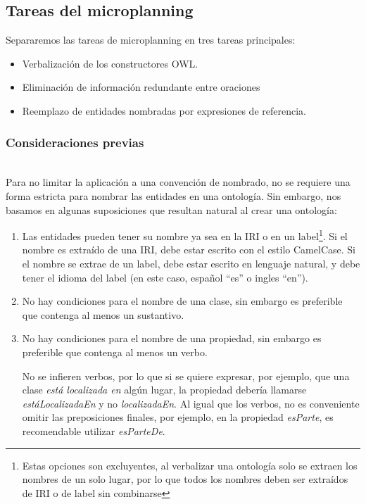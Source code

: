 \subsection{Tareas del microplanning}
Separaremos las tareas de microplanning en tres tareas principales: 
\begin{itemize}
    \item Verbalización de los constructores OWL.
    \item Eliminación de información redundante entre oraciones
    \item Reemplazo de entidades nombradas por expresiones de referencia.
\end{itemize}


\subsubsection{Consideraciones previas}
 \\
Para no limitar la aplicación a una convención de nombrado, no se requiere una forma estricta para nombrar las entidades en una ontología. Sin embargo, nos basamos en algunas suposiciones que resultan natural al crear una ontología:
\begin{enumerate}
    \item Las entidades pueden tener su nombre ya sea en la IRI o en un label\footnote{Estas opciones son excluyentes, al verbalizar una ontología solo se extraen los nombres de un solo lugar, por lo que todos los nombres deben ser extraídos de IRI o de label sin combinarse}. Si el nombre es extraído de una IRI, debe estar escrito con el estilo CamelCase. Si el nombre se extrae de un label, debe estar escrito en lenguaje natural, y debe tener el idioma del label (en este caso, español ``es'' o ingles ``en'').
    \item No hay condiciones para el nombre de una clase, sin embargo es preferible que contenga al menos un sustantivo.
    \item No hay condiciones para el nombre de una propiedad, sin embargo es preferible que contenga al menos un verbo. 
    
    No se infieren verbos, por lo que si se quiere expresar, por ejemplo, que una clase \emph{está localizada en} algún lugar, la propiedad debería llamarse \emph{estáLocalizadaEn} y no \emph{localizadaEn}. Al igual que los verbos, no es conveniente omitir las preposiciones finales, por ejemplo, en la propiedad \emph{esParte}, es recomendable utilizar \emph{esParteDe}.
\end{enumerate}

